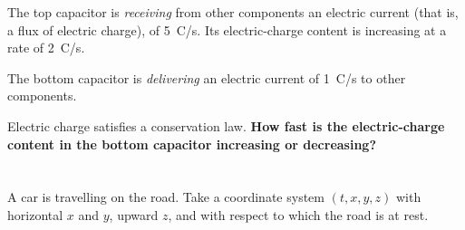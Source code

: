 \documentclass[a4paper,12pt,%
onecolumn,oneside,%
british%
]{memoir}
\renewcommand*{\|}[1][]{\nonscript\:#1\vert\nonscript\:\mathopen{}}
\begin{document}
%
The top capacitor is \emph{receiving} from other components an electric current (that is, a flux of electric charge), of \qty{5}{C/s}. Its electric-charge content is increasing at a rate of \qty{2}{C/s}.

The bottom capacitor is \emph{delivering} an electric current of \qty{1}{C/s} to other components.

Electric charge satisfies a conservation law. \textbf{How fast is the electric-charge content in the bottom capacitor increasing or decreasing?}


\section{}
\label{sec:calc_from_bal2-capacitors-carbreak}

A car is travelling on the road. Take a coordinate system $(t,x,y,z)$ with horizontal $x$ and $y$, upward $z$, and with respect to which the road is at rest.
\end{document}
